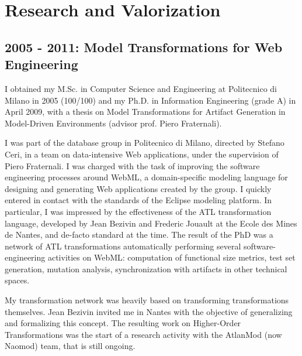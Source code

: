 \documentclass[10pt,a4paper]{article}
\begin{document}
\section{Research and Valorization}


\subsection{2005 - 2011: Model Transformations for Web Engineering}

I obtained my M.Sc. in Computer Science and Engineering at Politecnico di Milano in 2005 (100/100) and my Ph.D. in Information Engineering (grade A) in April 2009, with a thesis on Model Transformations for Artifact Generation in Model-Driven Environments (advisor prof. Piero Fraternali).

I was part of the database group in Politecnico di Milano, directed by Stefano Ceri, in a team on data-intensive Web applications, under the supervision of Piero Fraternali. 
I was charged with the task of improving the software engineering processes around WebML, a domain-specific modeling language for designing and generating Web applications created by the group. I quickly entered in contact with the standards of the Eclipse modeling platform. In particular, I was impressed by the effectiveness of the ATL transformation language, developed by Jean Bezivin and Frederic Jouault at the Ecole des Mines de Nantes, and de-facto standard at the time. 
The result of the PhD was a network of ATL transformations automatically performing several software-engineering activities on WebML: computation of functional size metrics, test set generation, mutation analysis, synchronization with artifacts in other technical spaces. 

My transformation network was heavily based on transforming transformations themselves. Jean Bezivin invited me in Nantes with the objective of generalizing and formalizing this concept. The resulting work on Higher-Order Transformations was the start of a research activity with the AtlanMod (now Naomod) team, that is still ongoing. 

\end{document}
